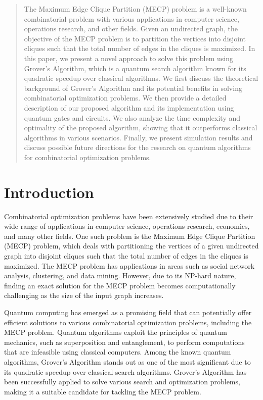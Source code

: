 \begin{abstract}
The Maximum Edge Clique Partition (MECP) problem is a well-known combinatorial problem with various applications in computer science, operations research, and other fields. Given an undirected graph, the objective of the MECP problem is to partition the vertices into disjoint cliques such that the total number of edges in the cliques is maximized. In this paper, we present a novel approach to solve this problem using Grover's Algorithm, which is a quantum search algorithm known for its quadratic speedup over classical algorithms. We first discuss the theoretical background of Grover's Algorithm and its potential benefits in solving combinatorial optimization problems. We then provide a detailed description of our proposed algorithm and its implementation using quantum gates and circuits. We also analyze the time complexity and optimality of the proposed algorithm, showing that it outperforms classical algorithms in various scenarios. Finally, we present simulation results and discuss possible future directions for the research on quantum algorithms for combinatorial optimization problems.

\end{abstract}

\section{Introduction}

Combinatorial optimization problems have been extensively studied due to their wide range of applications in computer science, operations research, economics, and many other fields. One such problem is the Maximum Edge Clique Partition (MECP) problem, which deals with partitioning the vertices of a given undirected graph into disjoint cliques such that the total number of edges in the cliques is maximized. The MECP problem has applications in areas such as social network analysis, clustering, and data mining. However, due to its NP-hard nature, finding an exact solution for the MECP problem becomes computationally challenging as the size of the input graph increases.

Quantum computing has emerged as a promising field that can potentially offer efficient solutions to various combinatorial optimization problems, including the MECP problem. Quantum algorithms exploit the principles of quantum mechanics, such as superposition and entanglement, to perform computations that are infeasible using classical computers. Among the known quantum algorithms, Grover's Algorithm \cite{grover1996} stands out as one of the most significant due to its quadratic speedup over classical search algorithms. Grover's Algorithm has been successfully applied to solve various search and optimization problems, making it a suitable candidate for tackling the MECP problem.

